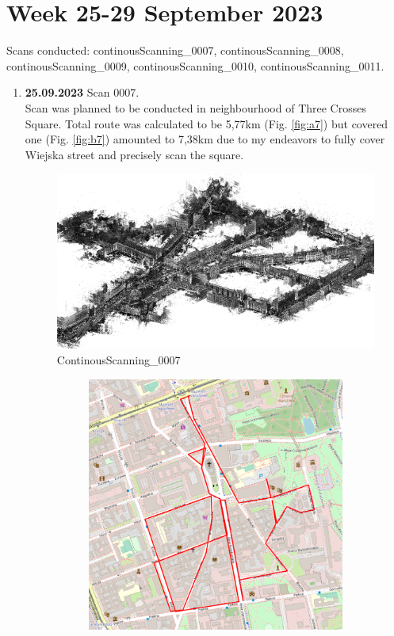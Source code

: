 \documentclass[a4paper,12pt]{book}
\begin{document}
\section{Week 25-29 September 2023} 
Scans conducted: continousScanning\_0007, continousScanning\_0008, continousScanning\_0009, continousScanning\_0010, continousScanning\_0011.\\
\begin{enumerate}
	\item \textbf{25.09.2023} Scan 0007. \\
	Scan was planned to be conducted in neighbourhood of Three Crosses Square. Total route was calculated to be 5,77km (Fig. \ref{fig:a7}) but covered one (Fig. \ref{fig:b7}) amounted to 7,38km due to my endeavors to fully cover Wiejska street and precisely scan the square.
	\begin{figure}[H]
		\includegraphics[width=1\linewidth]{cloud7}
		\caption{ContinousScanning\_0007}
	\end{figure}
	\begin{figure}[H]
		\centering
		\begin{subfigure}{.75\textwidth}
			\centering
			\includegraphics[width=1\linewidth]{route_p7}

\end{subfigure}
\end{figure}
\end{enumerate}
\end{document}
